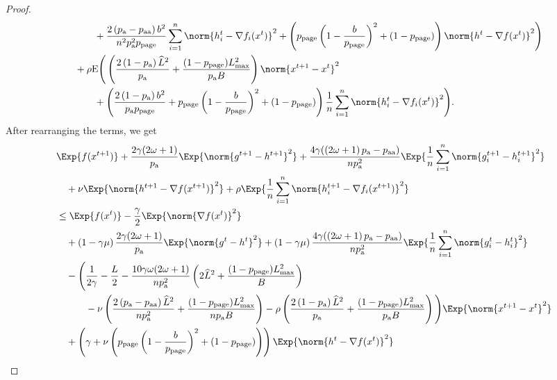 \documentclass{article}
\newcommand*{\probavailable}{\ensuremath{p_{\textnormal{a}}}}
\newcommand*{\probpairaa}{\ensuremath{p_{\textnormal{aa}}}}
\newcommand*{\probpage}{\ensuremath{p_{\text{page}}}}
\begin{document}
\begin{proof}
\begin{align*}
      &\qquad\quad + \frac{2\left(\probavailable - \probpairaa\right) b^2}{n^2 \probavailable^2 \probpage}\sum_{i=1}^n\norm{ h^t_i - \nabla f_i(x^{t})}^2 + \left(\probpage\left(1 - \frac{b}{\probpage}\right)^2 + (1 - \probpage)\right)\norm{h^{t} - \nabla f(x^{t})}^2\Bigg) \\
      &\quad + \rho {\rm E}\Bigg(\left(\frac{2\left(1 - \probavailable\right)\widehat{L}^2}{\probavailable} + \frac{(1 - \probpage)L_{\max}^2}{\probavailable B}\right) \norm{x^{t+1} - x^{t}}^2 \\
      &\qquad\quad +\left(\frac{2\left(1 - \probavailable\right)b^2}{\probavailable \probpage} + \probpage\left(1 - \frac{b}{\probpage}\right)^2 + (1 - \probpage)\right)\frac{1}{n}\sum_{i=1}^n\norm{h^{t}_i - \nabla f_i(x^{t})}^2\Bigg).
    \end{align*}
    After rearranging the terms, we get
    \begin{align*}
      &\Exp{f(x^{t + 1})} + \frac{2\gamma (2\omega + 1)}{\probavailable} \Exp{\norm{g^{t+1} - h^{t+1}}^2} + \frac{4 \gamma (\left(2 \omega + 1\right)\probavailable - \probpairaa)}{n \probavailable^2} \Exp{\frac{1}{n}\sum_{i=1}^n\norm{g^{t+1}_i - h^{t+1}_i}^2}\\
      &\quad  + \nu \Exp{\norm{h^{t+1} - \nabla f(x^{t+1})}^2} + \rho \Exp{\frac{1}{n}\sum_{i=1}^n\norm{h^{t+1}_i - \nabla f_i(x^{t+1})}^2}\\
      &\leq \Exp{f(x^t)} - \frac{\gamma}{2}\Exp{\norm{\nabla f(x^t)}^2} \\
      &\quad + \left(1 - \gamma \mu\right)\frac{2\gamma(2\omega + 1)}{\probavailable}\Exp{\norm{g^{t} - h^t}^2} + \left(1 - \gamma \mu\right)\frac{4 \gamma (\left(2 \omega + 1\right)\probavailable - \probpairaa)}{n \probavailable^2}\Exp{\frac{1}{n} \sum_{i=1}^n\norm{g^t_i - h^{t}_i}^2}\\
      &\quad - \Bigg(\frac{1}{2\gamma} - \frac{L}{2} - \frac{10 \gamma \omega (2 \omega + 1)}{n \probavailable^2} \left(2 \widehat{L}^2 + \frac{(1 - \probpage)L_{\max}^2}{B}\right) \\
      &\qquad\quad - \nu\left(\frac{2 \left(\probavailable - \probpairaa\right) \widehat{L}^2}{n \probavailable^2} + \frac{(1 - \probpage)L_{\max}^2}{n \probavailable B}\right) - \rho \left(\frac{2\left(1 - \probavailable\right)\widehat{L}^2}{\probavailable} + \frac{(1 - \probpage)L_{\max}^2}{\probavailable B}\right)\Bigg) \Exp{\norm{x^{t+1} - x^t}^2} \\
      &\quad + \left(\gamma + \nu \left(\probpage\left(1 - \frac{b}{\probpage}\right)^2 + (1 - \probpage)\right)\right) \Exp{\norm{h^{t} - \nabla f(x^{t})}^2} \\

\end{align*}
\end{proof}
\end{document}
